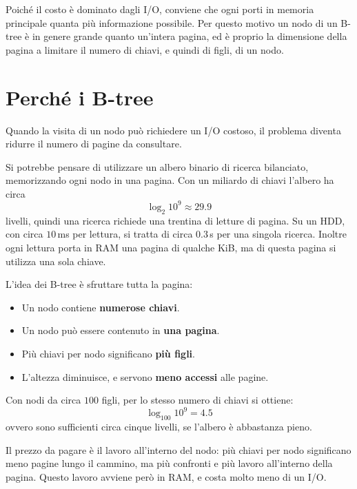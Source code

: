 Poiché il costo è dominato dagli I/O, conviene che ogni \PageRead{} porti in memoria principale quanta più informazione possibile. Per questo motivo un nodo di un B-tree è in genere grande quanto un'intera pagina, ed è proprio la dimensione della pagina a limitare il numero di chiavi, e quindi di figli, di un nodo.

\section{Perché i B-tree}\label{sec:btree-perche}
Quando la visita di un nodo può richiedere un I/O costoso, il problema diventa ridurre il numero di pagine da consultare.

Si potrebbe pensare di utilizzare un albero binario di ricerca bilanciato, memorizzando ogni nodo in una pagina. Con un miliardo di chiavi l'albero ha circa
\[
\log_2 10^9 \approx 29.9
\]
livelli, quindi una ricerca richiede una trentina di letture di pagina. Su un HDD, con circa $10$\,ms per lettura, si tratta di circa $0.3$\,s per una singola ricerca. Inoltre ogni lettura porta in RAM una pagina di qualche KiB, ma di questa pagina si utilizza una sola chiave.

L'idea dei B-tree è sfruttare tutta la pagina:
\begin{itemize}
    \item Un nodo contiene \textbf{numerose chiavi}.
    \item Un nodo può essere contenuto in \textbf{una pagina}.
    \item Più chiavi per nodo significano \textbf{più figli}.
    \item L'altezza diminuisce, e servono \textbf{meno accessi} alle pagine.
\end{itemize}
Con nodi da circa $100$ figli, per lo stesso numero di chiavi si ottiene:
\[
\log_{100} 10^9 = 4.5
\]
ovvero sono sufficienti circa cinque livelli, se l'albero è abbastanza pieno.

Il prezzo da pagare è il lavoro all'interno del nodo: più chiavi per nodo significano meno pagine lungo il cammino, ma più confronti e più lavoro all'interno della pagina. Questo lavoro avviene però in RAM, e costa molto meno di un I/O.

